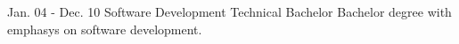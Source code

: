 \documentclass[american]{cv-class}
\begin{document}
\begin{entrylist}
	\entry
	{Jan. 04 - Dec. 10}
	{Software Development Technical Bachelor}
	{ }
	{Bachelor degree with emphasys on software development.}
	

\end{entrylist}
\end{document}

